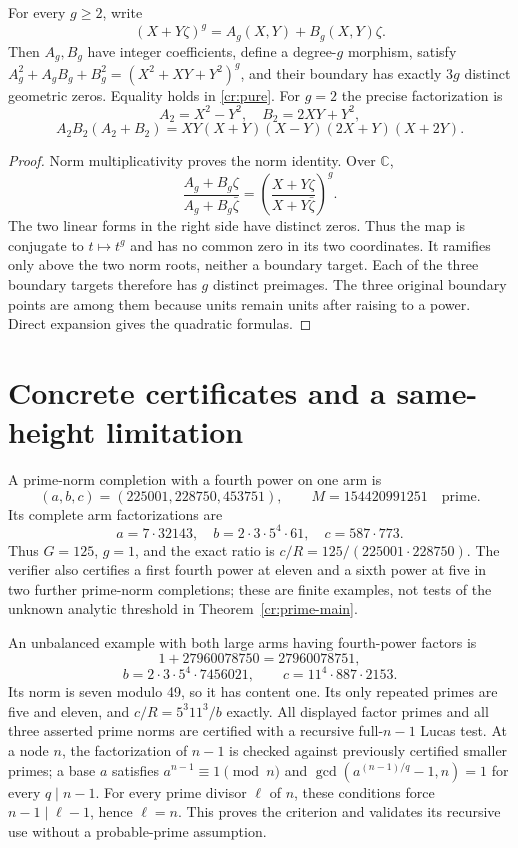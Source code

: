 \begin{proposition}\label{cr:sharpness}
For every $g\ge2$, write
\[
 (X+Y\zeta)^g=A_g(X,Y)+B_g(X,Y)\zeta.
\]
Then $A_g,B_g$ have integer coefficients, define a degree-$g$ morphism,
satisfy $A_g^2+A_gB_g+B_g^2=(X^2+XY+Y^2)^g$, and their boundary has
exactly $3g$ distinct geometric zeros. Equality holds in \eqref{cr:pure}.
For $g=2$ the precise factorization is
\[
 A_2=X^2-Y^2,\quad B_2=2XY+Y^2,
\]
\[
 A_2B_2(A_2+B_2)=XY(X+Y)(X-Y)(2X+Y)(X+2Y).
\]
\end{proposition}
\begin{proof}
Norm multiplicativity proves the norm identity. Over $\mathbb C$,
\[
 \frac{A_g+B_g\zeta}{A_g+B_g\bar\zeta}
   =\left(\frac{X+Y\zeta}{X+Y\bar\zeta}\right)^g.
\]
The two linear forms in the right side have distinct zeros. Thus the map is
conjugate to $t\mapsto t^g$ and has no common zero in its two coordinates.
It ramifies only above the two norm roots, neither a boundary target. Each of
the three boundary targets therefore has $g$ distinct preimages. The three
original boundary points are among them because units remain units after
raising to a power. Direct expansion gives the quadratic formulas.
\end{proof}

\section{Concrete certificates and a same-height limitation}
\label{cr:certificates}
A prime-norm completion with a fourth power on one arm is
\[
 (a,b,c)=(225001,228750,453751),\qquad
 M=154420991251\quad\text{prime}.
\]
Its complete arm factorizations are
\[
 a=7\cdot32143,\quad b=2\cdot3\cdot5^4\cdot61,\quad
 c=587\cdot773.
\]
Thus $G=125$, $g=1$, and the exact ratio is $c/R=125/(225001\cdot228750)$.
The verifier also certifies a first fourth power at eleven and a sixth power
at five in two further prime-norm completions; these are finite examples,
not tests of the unknown analytic threshold in Theorem~\ref{cr:prime-main}.

An unbalanced example with both large arms having fourth-power factors is
\[
 1+27960078750=27960078751,
\]
\[
 b=2\cdot3\cdot5^4\cdot7456021,\qquad
 c=11^4\cdot887\cdot2153.
\]
Its norm is seven modulo 49, so it has content one. Its only repeated primes
are five and eleven, and $c/R=5^3 11^3/b$ exactly. All displayed factor
primes and all three asserted prime norms are certified with a recursive
full-$n-1$ Lucas test. At a node $n$, the factorization of $n-1$ is checked
against previously certified smaller primes; a base $a$ satisfies
$a^{n-1}\equiv1\pmod n$ and
$\gcd(a^{(n-1)/q}-1,n)=1$ for every $q\mid n-1$. For every prime divisor
$\ell$ of $n$, these conditions force $n-1\mid\ell-1$, hence $\ell=n$.
This proves the criterion and validates its recursive use without a
probable-prime assumption.

